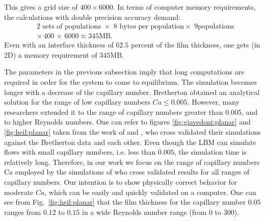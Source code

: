 \documentclass[preprint,12pt]{elsarticle}
\newcommand{\Ca}{\mathrm{Ca}}
\begin{document}
{\begin{description}
\end{description}



This gives a
grid size of $400 \times 6000$. In terms of computer memory
requirements, the calculations with double precision accuracy demand:
\begin{equation}
\begin{aligned}
&2\text{ sets of populations } \times \,\, 8\,\, \text{bytes per population
} \times \,\, 9 \text{
populations}\\
&\times\,400\,\times\,6000\approx 345 \mathrm{MB}. 
\end{aligned}
\end{equation}
Even with an interface thickness of $62.5$ percent  of the
film thickness, one gets (in 2D) a memory
requirement of $345 \mathrm{MB}$. 



   The parameters in the previous subsection imply that long
computations are required in order for the system to come to equilibrium. The simulation becomes
longer with a decrease of the
capillary number. Bretherton obtained an analytical solution for the range of low capillary
numbers $Ca \leq 0.005$. However, many researchers extended it to the range of capillary numbers
greater than
$0.005$, and to higher Reynolds numbers. One can refer to figures
  \ref{fig:giavedoni:planar} and \ref{fig:heil:planar} taken from the work of
  \citet{giavedoni-numerical} and \citet{heil-bretherton}, who cross validated their
  simulations against the Bretherton data and each other. Even though the LBM can simulate
flows with small capillary numbers, i.e. less than $0.005$, the simulation time
is relatively long. Therefore, in our work we focus on the range of capillary numbers $\Ca$
employed by the simulations of
\citet{giavedoni-numerical} who cross validated
results for all ranges of capillary numbers.  Our intention is
  to show physically correct behavior for moderate $Ca$,
which
  can be easily and quickly validated on a computer.
  One can see from Fig.~\ref{fig:heil:planar} that the film thickness for the
  capillary number $0.05$ ranges from $0.12$ to $0.15$ in a wide Reynolds
  number range (from $0$ to $300$).


}  
\end{document}
